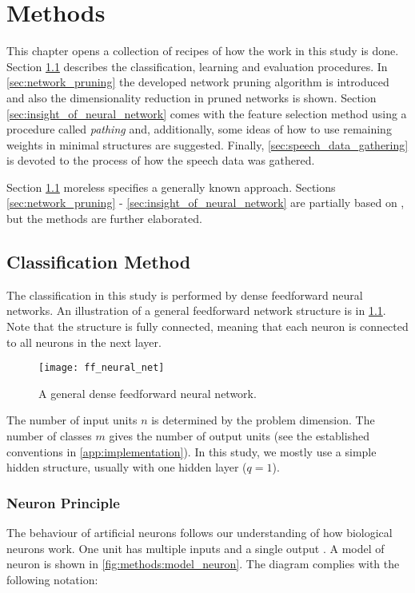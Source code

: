 \chapter{Methods} \label{chap:methods}
This chapter opens a collection of recipes of how the work in this study is done. Section \ref{sec:classification_method} describes the classification, learning and evaluation procedures. In \cref{sec:network_pruning} the developed network pruning algorithm is introduced and also the dimensionality reduction in pruned networks is shown. Section \ref{sec:insight_of_neural_network} comes with the feature selection method using a procedure called \textit{pathing} and, additionally, some ideas of how to use remaining weights in minimal structures are suggested. Finally, \cref{sec:speech_data_gathering} is devoted to the process of how the speech data was gathered.

Section \ref{sec:classification_method} moreless specifies a generally known approach. Sections \ref{sec:network_pruning} - \ref{sec:insight_of_neural_network} are partially based on \citep{bulin:2016}, but the methods are further elaborated.

\section{Classification Method} \label{sec:classification_method}
The classification in this study is performed by dense feedforward neural networks. An illustration of a general feedforward network structure is in \cref{fig:methods:ff_neural_net}. Note that the structure is fully connected, meaning that each neuron is connected to all neurons in the next layer.

\begin{figure}[H]
\centering
\texttt{[image: ff\_neural\_net]}
\caption{A general dense feedforward neural network.}
\label{fig:methods:ff_neural_net}
\end{figure}

The number of input units $ n $ is determined by the problem dimension. The number of classes $ m $ gives the number of output units (see the established conventions in \cref{app:implementation}). In this study, we mostly use a simple hidden structure, usually with one hidden layer ($ q = 1 $).

\subsection*{Neuron Principle}
The behaviour of artificial neurons follows our understanding of how biological neurons work. One unit has multiple inputs and a single output \citep{rosenblatt:perceptron}. A model of neuron is shown in \cref{fig:methods:model_neuron}. The diagram complies with the following notation:

